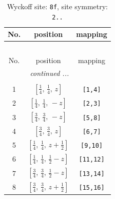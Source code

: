 \documentclass[fleqn,8pt]{jsarticle}
\begin{document}
\begin{longtable}{ccc}
\caption{Wyckoff site: {\tt 8f}, site symmetry: {\tt 2..}}
 \\
 \hline \hline
No. & position & mapping \\ \hline \endfirsthead

\multicolumn{2}{l}{\tablename\ \thetable{}} \\
 \hline \hline
No. & position & mapping \\ \hline \endhead

 \hline \hline
\multicolumn{2}{r}{\footnotesize\it continued ...} \\ \endfoot

 \hline \hline
\multicolumn{2}{r}{} \\ \endlastfoot

1 & $\left[ \frac{1}{4},\, \frac{1}{4},\, z \right]$ & {\tt [1,4]} \\ \hline
2 & $\left[ \frac{1}{4},\, \frac{1}{4},\, - z \right]$ & {\tt [2,3]} \\ \hline
3 & $\left[ \frac{3}{4},\, \frac{3}{4},\, - z \right]$ & {\tt [5,8]} \\ \hline
4 & $\left[ \frac{3}{4},\, \frac{3}{4},\, z \right]$ & {\tt [6,7]} \\ \hline
5 & $\left[ \frac{1}{4},\, \frac{1}{4},\, z + \frac{1}{2} \right]$ & {\tt [9,10]} \\ \hline
6 & $\left[ \frac{1}{4},\, \frac{1}{4},\, \frac{1}{2} - z \right]$ & {\tt [11,12]} \\ \hline
7 & $\left[ \frac{3}{4},\, \frac{3}{4},\, \frac{1}{2} - z \right]$ & {\tt [13,14]} \\ \hline
8 & $\left[ \frac{3}{4},\, \frac{3}{4},\, z + \frac{1}{2} \right]$ & {\tt [15,16]} \\
\end{longtable}
\renewcommand{\arraystretch}{1.2}
\end{document}
